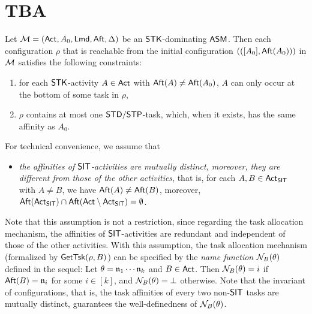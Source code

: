 \section{TBA}




\begin{proposition}\label{prop-stk}
    Let ${\mathcal{M} }=({\sf Act},A_0,{\sf Lmd},{\sf Aft},\Delta)$ be an $\mathsf{STK}$-dominating $\textsf{ASM}$. Then each configuration $\rho$ that is reachable from the initial configuration $(([A_0],{\sf Aft}(A_0)))$ in ${\mathcal{M} }$ satisfies the following constraints:
    \begin{enumerate}
        \item for each $\mathsf{STK}$-activity $A\in{\sf Act}$ with ${\sf Aft}(A)\neq{\sf Aft}(A_0)$, $A$ can only occur at the bottom of some task in $\rho$, 
        \item $\rho$ contains at most one ${\sf STD}/{\sf STP}$-task, which, when it exists, has the same affinity as $A_0$.
    \end{enumerate}
\end{proposition}





For technical convenience, we assume that 
\begin{itemize}
	\item \emph{the affinities of ${\sf SIT}$-activities are mutually distinct, moreover, they are different from those of the other activities}, that is, for each $A, B \in {\sf Act}_{\sf SIT}$ with $A \neq B$, we have ${\sf Aft}(A) \neq {\sf Aft}(B)$, moreover, ${\sf Aft}({\sf Act}_{\sf SIT}) \cap {\sf Aft}({\sf Act} \setminus {\sf Act}_{\sf SIT}) = \emptyset$.
\end{itemize} Note that this assumption is not a restriction, since regarding the task allocation mechanism, the affinities of ${\sf SIT}$-activities are redundant and independent of those of the other activities. With this assumption, the task allocation mechanism (formalized by $\mathsf{GetTsk}(\rho, B)$) can be specified by the \emph{name function} $\mathcal{N}_B(\theta)$ defined in the sequel:  Let $\theta = \mathfrak{n}_1 \cdots \mathfrak{n}_k$ and $B \in {\sf Act}$. Then $\mathcal{N}_B(\theta) = i$ if ${\sf Aft}(B) = \mathfrak{n}_i$ for some $i \in [k]$, and $\mathcal{N}_B(\theta) = \bot$ otherwise. Note that the invariant of configurations, that is, the task affinities of every two non-${\sf SIT}$ tasks are mutually distinct, guarantees the well-definedness of $\mathcal{N}_B(\theta)$.

